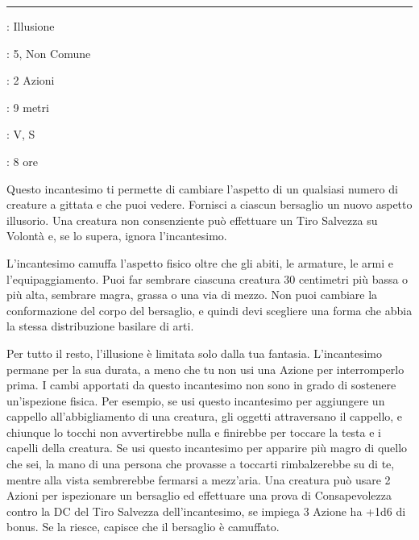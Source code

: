 \begin{multicols}{2}
\smallskip\noindent\rule{\linewidth}{2pt} \hypertarget{Sembrare}{}\medskip{}
\noindent
\begin{description}[noitemsep, topsep=0pt, parsep=0pt, partopsep=0pt, leftmargin=0cm, labelwidth=2.8cm]
	\item[\textbf{Lista di Magia}]: Illusione
	\item[\textbf{Livello}]: 5, Non Comune
	\item[\textbf{T. di Lancio}]: 2 Azioni
	\item[\textbf{Gittata}]: 9 metri
	\item[\textbf{Componenti}]: V, S
	\item[\textbf{Durata}]: 8 ore
\end{description}

Questo incantesimo ti permette di cambiare l'aspetto di un qualsiasi numero di creature a gittata e che puoi vedere. Fornisci a ciascun bersaglio un nuovo aspetto illusorio. Una creatura non consenziente può effettuare un Tiro Salvezza su Volontà e, se lo supera, ignora l'incantesimo.

L'incantesimo camuffa l'aspetto fisico oltre che gli abiti, le armature, le armi e l'equipaggiamento. Puoi far sembrare ciascuna creatura 30 centimetri più bassa o più alta, sembrare magra, grassa o una via di mezzo. Non puoi cambiare la conformazione del corpo del bersaglio, e quindi devi scegliere una forma che abbia la stessa distribuzione basilare di arti.

Per tutto il resto, l'illusione è limitata solo dalla tua fantasia. L'incantesimo permane per la sua durata, a meno che tu non usi una Azione per interromperlo prima. I cambi apportati da questo incantesimo non sono in grado di sostenere un'ispezione fisica. Per esempio, se usi questo incantesimo per aggiungere un cappello all'abbigliamento di una creatura, gli oggetti attraversano il cappello, e chiunque lo tocchi non avvertirebbe nulla e finirebbe per toccare la testa e i capelli della creatura.
Se usi questo incantesimo per apparire più magro di quello che sei, la mano di una persona che provasse a toccarti rimbalzerebbe su di te, mentre alla vista sembrerebbe fermarsi a mezz'aria. Una creatura può usare 2 Azioni per ispezionare un bersaglio ed effettuare una prova di Consapevolezza contro la DC del Tiro Salvezza dell'incantesimo, se impiega 3 Azione ha +1d6 di bonus. Se la riesce, capisce che il bersaglio è camuffato.


\end{multicols}
